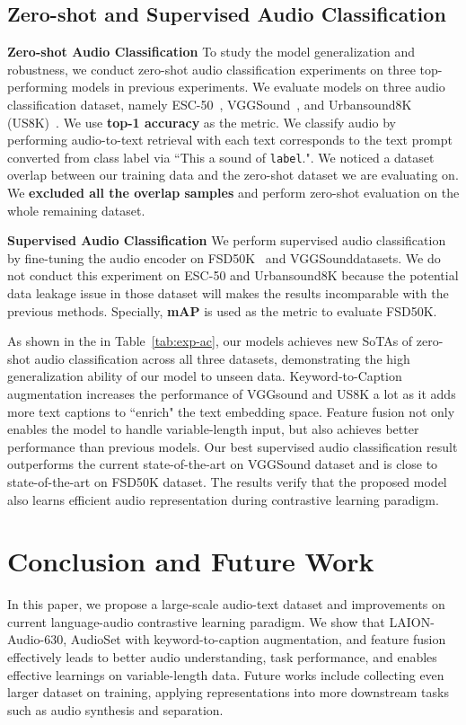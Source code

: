 \vspace{-0.2cm}
\subsection{Zero-shot and Supervised Audio Classification}

\noindent \textbf{Zero-shot Audio Classification} To study the model generalization and robustness, we conduct zero-shot audio classification experiments on three top-performing models in previous experiments. We evaluate models on three audio classification dataset, namely ESC-50~\cite{esc50}, VGGSound~\cite{vggsound}, and Urbansound8K (US8K)~\cite{us8k}. We use \textbf{top-1 accuracy} as the metric. We classify audio by performing audio-to-text retrieval with each text corresponds to the text prompt converted from class label via
``This a sound of \texttt{label}.". We noticed a dataset overlap between our training data and the zero-shot dataset we are evaluating on. We \textbf{excluded all the overlap samples} and perform zero-shot evaluation on the whole remaining dataset.

\vspace{0.1cm}
\noindent \textbf{Supervised Audio Classification}
We perform supervised audio classification by fine-tuning the audio encoder on FSD50K~\cite{fsd50k} and VGGSounddatasets. We do not conduct this experiment on ESC-50 and Urbansound8K because the potential data leakage issue in those dataset will makes the results incomparable with the previous methods. Specially, \textbf{mAP} is used as the metric to evaluate FSD50K.

As shown in the in Table~\ref{tab:exp-ac}, our models achieves new SoTAs of zero-shot audio classification across all three datasets, demonstrating the high generalization ability of our model to unseen data. Keyword-to-Caption augmentation increases the performance of VGGsound and US8K a lot as it adds more text captions to ``enrich" the text embedding space. Feature fusion not only enables the model to handle variable-length input, but also achieves better performance than previous models. Our best supervised audio classification result outperforms the current state-of-the-art on VGGSound dataset and is close to state-of-the-art on FSD50K dataset. The results verify that the proposed model also learns efficient audio representation during contrastive learning paradigm. 

\vspace{-0.3cm}
\section{Conclusion and Future Work}

In this paper, we propose a large-scale audio-text dataset and improvements on current language-audio contrastive learning paradigm. We show that LAION-Audio-630, AudioSet with keyword-to-caption augmentation, and feature fusion effectively leads to better audio understanding, task performance, and enables effective learnings on variable-length data. Future works include collecting even larger dataset on training, applying representations into more downstream tasks such as audio synthesis and separation.

\clearpage

